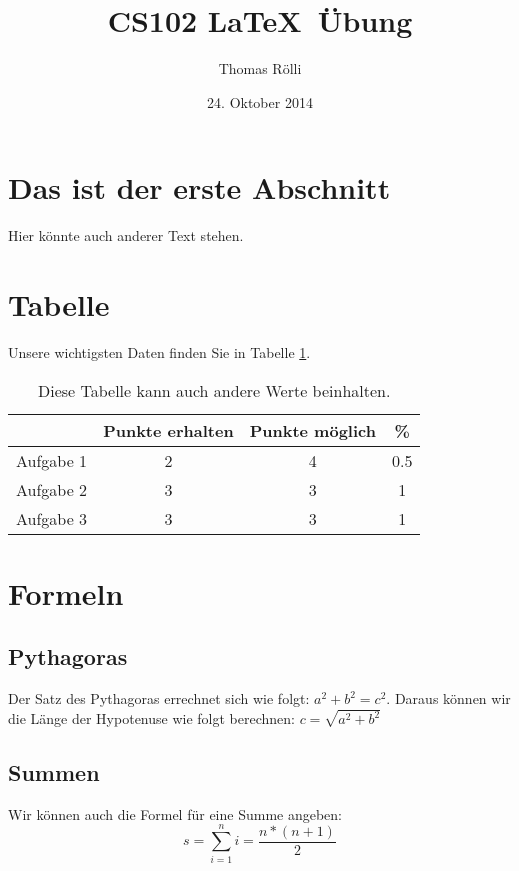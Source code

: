 \documentclass[11pt,a4paper]{article}
\date{24. Oktober 2014}
\author{Thomas Rölli}
\title{CS102 \LaTeX\ Übung}
\begin{document}
\maketitle

\section{Das ist der erste Abschnitt}
Hier könnte auch anderer Text stehen.
\section{Tabelle}
Unsere wichtigsten Daten finden Sie in Tabelle \ref{tab1}.
\begin{table}[h]
\centering
\begin{tabular}{c|c|c|c}
& Punkte erhalten & Punkte möglich & \% \\
\hline
Aufgabe 1 & 2 & 4 & 0.5 \\
Aufgabe 2 & 3 & 3 & 1 \\
Aufgabe 3 & 3 & 3 & 1 \\
\end{tabular}
\caption{Diese Tabelle kann auch andere Werte beinhalten.}
\label{tab1}
\end{table}
\section{Formeln}
\subsection{Pythagoras}
Der Satz des Pythagoras errechnet sich wie folgt: $a^2+b^2=c^2$. Daraus können wir die Länge der Hypotenuse wie folgt berechnen: $c=\sqrt{a^2+b^2}$
\subsection{Summen}
Wir können auch die Formel für eine Summe angeben:
\begin{equation}
s=\sum_{i=1}^{n}i=\frac{n*(n+1)}{2}
\end{equation}
\end{document}

